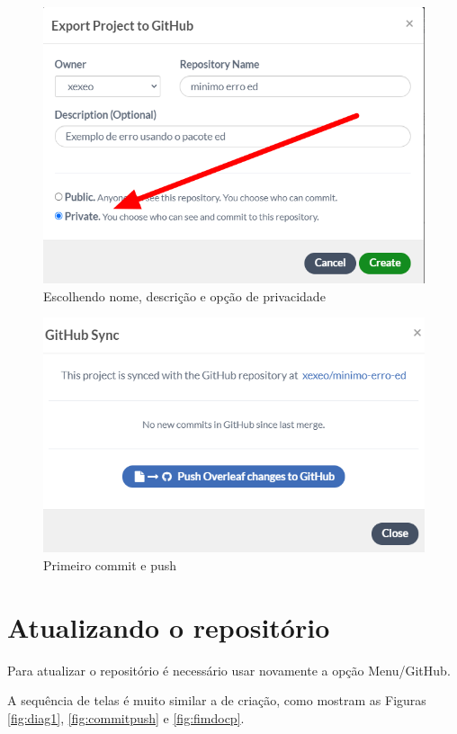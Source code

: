 \documentclass{article}
\begin{document}
\begin{figure}[hbt]
    \centering
    \includegraphics[width=0.9\linewidth]{Image003.png}
    \caption{Escolhendo nome, descrição e opção de privacidade}
    \label{fig:nomepriv}
\end{figure}

\begin{figure}[hbt]
    \centering
    \includegraphics[width=0.9\linewidth]{Image004.png}
    \caption{Primeiro commit e push}
    \label{fig:commit1}
\end{figure}

\section{Atualizando o repositório}

Para atualizar o repositório é necessário usar novamente a opção Menu/GitHub.

A sequência de telas é muito similar a de criação, como mostram as Figuras  \ref{fig:diag1}, \ref{fig:commitpush} e \ref{fig:fimdocp}.
\end{document}
